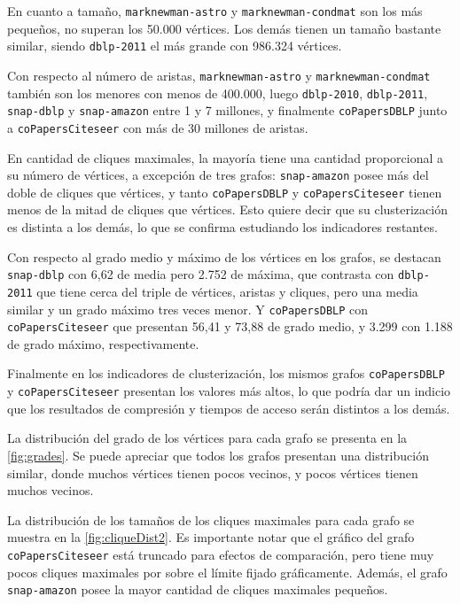 En cuanto a tamaño, \texttt{marknewman-astro} y \texttt{marknewman-condmat} son los más pequeños, no superan los 50.000 vértices. Los demás tienen un tamaño bastante similar, siendo \texttt{dblp-2011} el más grande con 986.324 vértices.

Con respecto al número de aristas, \texttt{marknewman-astro} y \texttt{marknewman-condmat} también son los menores con menos de 400.000, luego \texttt{dblp-2010}, \texttt{dblp-2011}, \texttt{snap-dblp} y \texttt{snap-amazon} entre 1 y 7 millones, y finalmente \texttt{coPapersDBLP} junto a \texttt{coPapersCiteseer} con más de 30 millones de aristas.

En cantidad de cliques maximales, la mayoría tiene una cantidad proporcional a su número de vértices, a excepción de tres grafos: \texttt{snap-amazon} posee más del doble de cliques que vértices, y tanto \texttt{coPapersDBLP} y \texttt{coPapersCiteseer} tienen menos de la mitad de cliques que vértices. Esto quiere decir que su clusterización es distinta a los demás, lo que se confirma estudiando los indicadores restantes.

Con respecto al grado medio y máximo de los vértices en los grafos, se destacan \texttt{snap-dblp} con 6,62 de media pero 2.752 de máxima, que contrasta con \texttt{dblp-2011} que tiene cerca del triple de vértices, aristas y cliques, pero una media similar y un grado máximo tres veces menor. Y \texttt{coPapersDBLP} con \texttt{coPapersCiteseer} que presentan 56,41 y 73,88 de grado medio, y 3.299 con 1.188 de grado máximo, respectivamente.

Finalmente en los indicadores de clusterización, los mismos grafos \texttt{coPapersDBLP} y \texttt{coPapersCiteseer} presentan los valores más altos, lo que podría dar un indicio que los resultados de compresión y tiempos de acceso serán distintos a los demás. 




La distribución del grado de los vértices para cada grafo se presenta en la \autoref{fig:grades}. Se puede apreciar que todos los grafos presentan una distribución similar, donde muchos vértices tienen pocos vecinos, y pocos vértices tienen muchos vecinos.




La distribución de los tamaños de los cliques maximales para cada grafo se muestra en la \autoref{fig:cliqueDist2}. Es importante notar que el gráfico del grafo \texttt{coPapersCiteseer} está truncado para efectos de comparación, pero tiene muy pocos cliques maximales por sobre el límite fijado gráficamente. Además, el grafo \texttt{snap-amazon} posee la mayor cantidad de cliques maximales pequeños.

